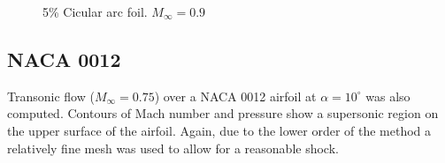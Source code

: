 \documentclass[12pt]{article}
\begin{document}
\begin{figure}[ht]
{}
\hspace{-0.25in}
\caption{5\% Cicular arc foil. $M_{\infty}=0.9$}
\label{bump}
\end{figure}


 \pagebreak
 \subsection{NACA 0012}

Transonic flow ($M_{\infty} = 0.75$) over a NACA 0012 airfoil at $\alpha = 10^{\circ}$ was also computed. Contours of Mach number and pressure show a supersonic region on the upper surface of the airfoil. Again, due to the lower order of the method a relatively fine mesh was used to allow for a reasonable shock.
\end{document}
